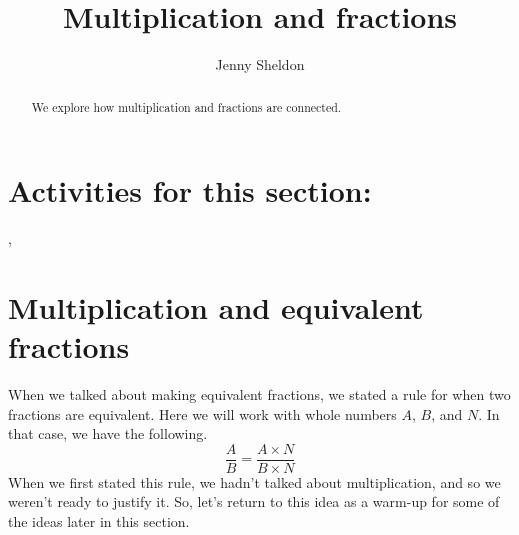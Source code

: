 \documentclass{ximera}
\title{Multiplication and fractions}
\author{Jenny Sheldon}
\begin{document}
\begin{abstract}
We explore how multiplication and fractions are connected.
\end{abstract}
\maketitle

\section{Activities for this section:} 
, 

\section{Multiplication and equivalent fractions}

When we talked about making equivalent fractions, we stated a rule for when two fractions are equivalent. Here we will work with whole numbers $A$, $B$, and $N$. In that case, we have the following.
\[
\frac{A}{B} = \frac{A \times N}{B \times N}
\]
When we first stated this rule, we hadn't talked about multiplication, and so we weren't ready to justify it. So, let's return to this idea as a warm-up for some of the ideas later in this section.
\end{document}
